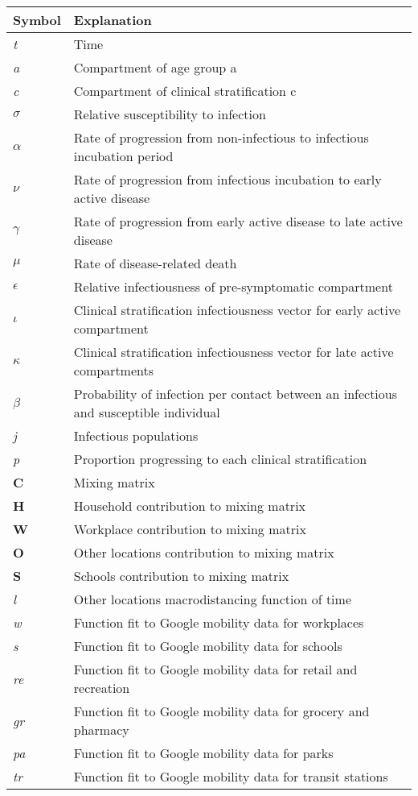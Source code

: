 \clearpage
\begin{table}[t] 

    \begin{tabular}{| p{3.4cm} | p{10.4cm} |}
	\hline
	\textbf{Symbol} & \textbf{Explanation} \\
	\hline
    \textit{t} & Time  \\
    {\textit{a}} & Compartment of age group a \\
    {\textit{c}} & Compartment of clinical stratification c \\
    $\sigma$ & Relative susceptibility to infection \\
    $\alpha$ & Rate of progression from non-infectious to infectious incubation period \\
    $\nu$ & Rate of progression from infectious incubation to early active disease \\
    $\gamma$ & Rate of progression from early active disease to late active disease \\
    $\mu$ & Rate of disease-related death \\
    $\epsilon$ & Relative infectiousness of pre-symptomatic compartment \\
    $\iota$ & Clinical stratification infectiousness vector for early active compartment \\
    $\kappa$ & Clinical stratification infectiousness vector for late active compartments \\
    $\beta$ & Probability of infection per contact between an infectious and susceptible individual \\
    \textit{j} & Infectious populations \\
    \textit{p} & Proportion progressing to each clinical stratification \\
    \textbf{C} & Mixing matrix \\
    \textbf{H} & Household contribution to mixing matrix \\
    \textbf{W} & Workplace contribution to mixing matrix \\
    \textbf{O} & Other locations contribution to mixing matrix \\
    \textbf{S} & Schools contribution to mixing matrix \\
    \textit{l} & Other locations macrodistancing function of time \\
    \textit{w} & Function fit to Google mobility data for workplaces \\
    \textit{s} & Function fit to Google mobility data for schools \\
    \textit{re} & Function fit to Google mobility data for retail and recreation \\
    \textit{gr} & Function fit to Google mobility data for grocery and pharmacy \\
    \textit{pa} & Function fit to Google mobility data for parks \\
    \textit{tr} & Function fit to Google mobility data for transit stations \\
    \hline
    \end{tabular}

\end{table}

\clearpage


